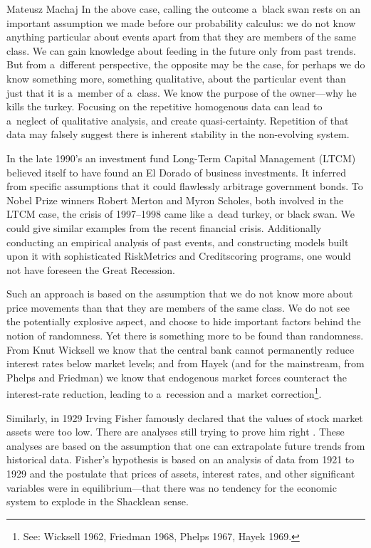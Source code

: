 \begin{artengenv}{Mateusz Machaj}
In the above case, calling the outcome a~black swan rests on an important assumption we made before our probability calculus: we do not know anything particular about events apart from that they are members of the same class. We can gain knowledge about feeding in the future only from past trends. But from a~different perspective, the opposite may be the case, for perhaps we do know something more, something qualitative, about the particular event than just that it is a~member of a~class. We know the purpose of the owner---why he kills the turkey. Focusing on the repetitive homogenous data can lead to a~neglect of qualitative analysis, and create quasi-certainty. Repetition of that data may falsely suggest there is inherent stability in the non-evolving system.



In the late 1990's an investment fund Long-Term Capital Management (LTCM) believed itself to have found an El Dorado of business investments. It inferred from specific assumptions that it could flawlessly arbitrage government bonds. To Nobel Prize winners Robert Merton and Myron Scholes, both involved in the LTCM case, the crisis of 1997–1998 came like a~dead turkey, or black swan. We could give similar examples from the recent financial crisis. Additionally conducting an empirical analysis of past events, and constructing models built upon it with sophisticated RiskMetrics and Creditscoring programs, one would not have foreseen the Great Recession.



Such an approach is based on the assumption that we do not know more about price movements than that they are members of the same class. We do not see the potentially explosive aspect, and choose to hide important factors behind the notion of randomness. Yet there is something more to be found than randomness. From Knut Wicksell we know that the central bank cannot permanently reduce interest rates below market levels; and from Hayek (and for the mainstream, from Phelps and Friedman) we know that endogenous market forces counteract the interest-rate reduction, leading to a~recession and a~market correction\footnote{See: Wicksell 1962, Friedman 1968, Phelps 1967, Hayek 1969.}.



Similarly, in 1929 Irving Fisher famously declared that the values of stock market assets were too low. There are analyses still trying to prove him right 
\parencite[see, for example,][]{mcgrattan_1929_2003}. %
 These analyses are based on the assumption that one can extrapolate future trends from historical data. Fisher's hypothesis is based on an analysis of data from 1921 to 1929 and the postulate that prices of assets, interest rates, and other significant variables were in equilibrium---that there was no tendency for the economic system to explode in the Shacklean sense.




\end{artengenv}
